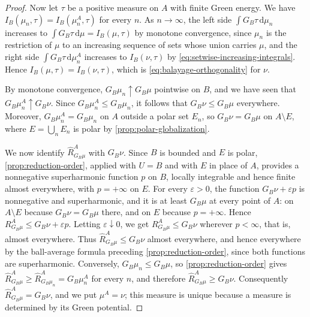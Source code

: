 \begin{proof}
Now let $\tau$ be a positive measure on $A$ with finite Green energy. We have $I_B(\mu_n,\tau)=I_B(\mu_n^A,\tau)$ for every $n$. As $n\to\infty$, the left side $\int G_B\tau\,\mathrm d\mu_n$ increases to $\int G_B\tau\,\mathrm d\mu=I_B(\mu,\tau)$ by monotone convergence, since $\mu_n$ is the restriction of $\mu$ to an increasing sequence of sets whose union carries $\mu$, and the right side $\int G_B\tau\,\mathrm d\mu_n^A$ increases to $I_B(\nu,\tau)$ by \eqref{eq:setwise-increasing-integrals}. Hence $I_B(\mu,\tau)=I_B(\nu,\tau)$, which is \eqref{eq:balayage-orthogonality} for $\nu$.

By monotone convergence, $G_B\mu_n\uparrow G_B\mu$ pointwise on $B$, and we have seen that $G_B\mu_n^A\uparrow G_B\nu$. Since $G_B\mu_n^A\leq G_B\mu_n$, it follows that $G_B\nu\leq G_B\mu$ everywhere. Moreover, $G_B\mu_n^A=G_B\mu_n$ on $A$ outside a polar set $E_n$, so $G_B\nu=G_B\mu$ on $A\setminus E$, where $E=\bigcup_nE_n$ is polar by \cref{prop:polar-globalization}.

We now identify $\widehat R_{G_B\mu}^A$ with $G_B\nu$. Since $B$ is bounded and $E$ is polar, \cref{prop:reduction-order}, applied with $U=B$ and with $E$ in place of $A$, provides a nonnegative superharmonic function $p$ on $B$, locally integrable and hence finite almost everywhere, with $p=+\infty$ on $E$. For every $\varepsilon>0$, the function $G_B\nu+\varepsilon p$ is nonnegative and superharmonic, and it is at least $G_B\mu$ at every point of $A$: on $A\setminus E$ because $G_B\nu=G_B\mu$ there, and on $E$ because $p=+\infty$. Hence $R_{G_B\mu}^A\leq G_B\nu+\varepsilon p$. Letting $\varepsilon\downarrow0$, we get $R_{G_B\mu}^A\leq G_B\nu$ wherever $p<\infty$, that is, almost everywhere. Thus $\widehat R_{G_B\mu}^A\leq G_B\nu$ almost everywhere, and hence everywhere by the ball-average formula preceding \cref{prop:reduction-order}, since both functions are superharmonic. Conversely, $G_B\mu_n\leq G_B\mu$, so \cref{prop:reduction-order} gives $\widehat R_{G_B\mu}^A\geq\widehat R_{G_B\mu_n}^A=G_B\mu_n^A$ for every $n$, and therefore $\widehat R_{G_B\mu}^A\geq G_B\nu$. Consequently $\widehat R_{G_B\mu}^A=G_B\nu$, and we put $\mu^A=\nu$; this measure is unique because a measure is determined by its Green potential.


\end{proof}

